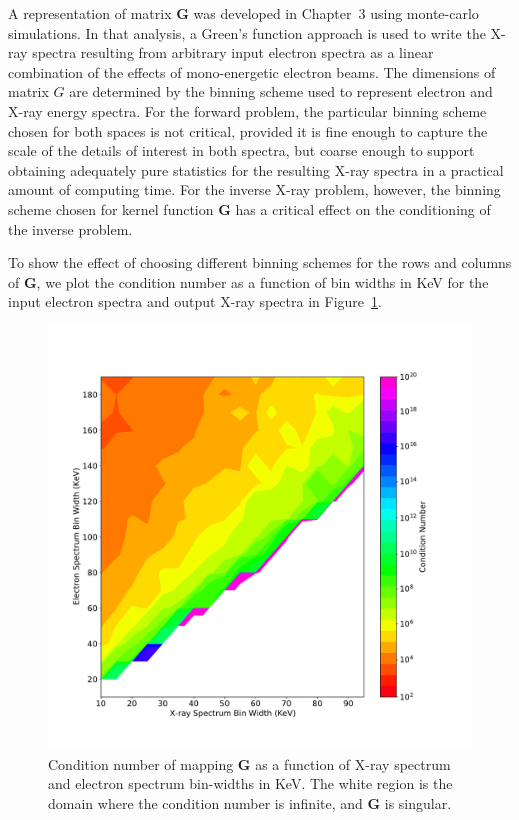 A representation of matrix $\mathbf{G}$ was developed in Chapter~3 using monte-carlo simulations. In that analysis, a Green's function approach is used to write the X-ray spectra resulting from arbitrary input electron spectra as a linear combination of the effects of mono-energetic electron beams. The dimensions of matrix $G$ are determined by the binning scheme used to represent electron and X-ray energy spectra. For the forward problem, the particular binning scheme chosen for both spaces is not critical, provided it is fine enough to capture the scale of the details of interest in both spectra, but coarse enough to support obtaining adequately pure statistics for the resulting X-ray spectra in a practical amount of computing time. For the inverse X-ray problem, however, the binning scheme chosen for kernel function $\mathbf{G}$ has a critical effect on the conditioning of the inverse problem.

To show the effect of choosing different binning schemes for the rows and columns of $\mathbf{G}$, we plot the condition number as a function of bin widths in KeV for the input electron spectra and output X-ray spectra in Figure~\ref{condition_number_binning}. 

\begin{figure}[p]
\label{condition_number_binning}
\centering
\includegraphics[width=1.0\textwidth]{figures/fig_1.pdf}
\caption{Condition number of mapping $\mathbf{G}$ as a function of X-ray spectrum and electron spectrum bin-widths in KeV. The white region is the domain where the condition number is infinite, and $\mathbf{G}$ is singular.}
\end{figure}

